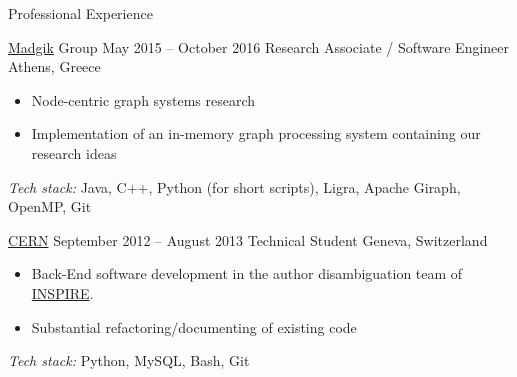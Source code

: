 \documentclass{resume}
\begin{document}
\begin{rSection}{Professional Experience}
\begin{rSubsection}
  {\href{https://www.madgik.di.uoa.gr/about}{Madgik} Group}
  {May 2015 -- October 2016}
  {Research Associate / Software Engineer}
  {Athens, Greece}
    \begin{itemize}[label={-}]
\setlength\itemsep{-0.3em}
   \item Node-centric graph systems research
   \item Implementation of an in-memory graph processing system containing our research ideas
    \end{itemize}
   \textit{Tech stack:} Java, C++, Python (for short scripts), Ligra, Apache Giraph, OpenMP, Git

   
\end{rSubsection}


\begin{rSubsection}
  {\href{https://home.cern/about}{CERN}}
  {September 2012 -- August 2013}
  {Technical Student}
  {Geneva, Switzerland}
  \begin{itemize}[label={-}]
\setlength\itemsep{-0.3em}
   	\item Back-End software development in the author disambiguation team of \href{http://inspirehep.net/}{INSPIRE}. 
	\item Substantial refactoring/documenting of existing code
  \end{itemize}
    \textit{Tech stack:} Python, MySQL, Bash, Git
\end{rSubsection}





\end{rSection}
\end{document}
